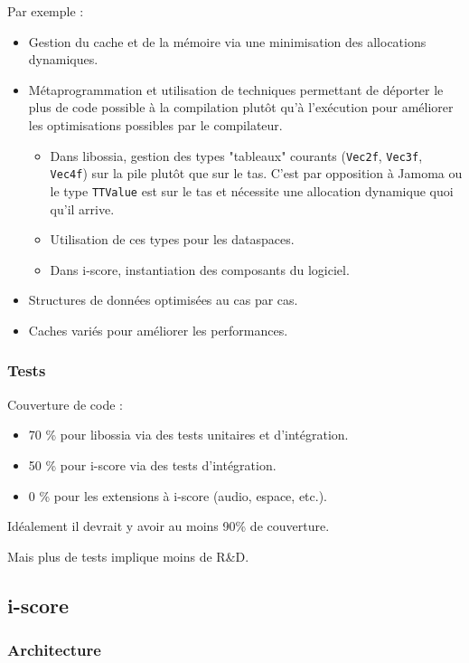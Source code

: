 \documentclass[french,a4paper,openany,12pt]{book}
\begin{document}
Par exemple : 
\begin{itemize}
    \item Gestion du cache et de la mémoire via une minimisation des allocations dynamiques.
    \item Métaprogrammation et utilisation de techniques permettant de déporter le plus 
    de code possible à la compilation plutôt qu'à l'exécution pour améliorer les optimisations
    possibles par le compilateur.
    \begin{itemize}
        \item Dans libossia, gestion des types "tableaux" courants (\lstinline|Vec2f|, \lstinline|Vec3f|, \lstinline|Vec4f|) sur la pile plutôt que sur le tas. 
        C'est par opposition à Jamoma ou le type \lstinline|TTValue| est sur le tas et nécessite une allocation dynamique quoi qu'il arrive.
        \item Utilisation de ces types pour les dataspaces.
        \item Dans i-score, instantiation des composants du logiciel.
    \end{itemize}
    \item Structures de données optimisées au cas par cas.
    \item Caches variés pour améliorer les performances.
\end{itemize}

\subsubsection{Tests}
Couverture de code : 

\begin{itemize}
    \item 70 \% pour libossia via des tests unitaires et d'intégration.
    \item 50 \% pour i-score via des tests d'intégration.
    \item 0 \% pour les extensions à i-score (audio, espace, etc.).
\end{itemize}

Idéalement il devrait y avoir au moins 90\% de couverture.

Mais plus de tests implique moins de R\&D.

\subsection{i-score}
\subsubsection{Architecture}
\end{document}
